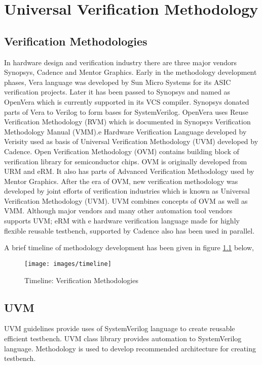 \chapter{Universal Verification Methodology}

\section{Verification Methodologies}

In hardware design and verification industry there are three major vendors Synopsys, Cadence and Mentor Graphics. Early in the methodology development phases, Vera language was developed by Sun Micro Systems for its ASIC verification projects. Later it has been passed to Synopsys and named as OpenVera which is currently supported in its VCS compiler. Synopsys donated parts of Vera to Verilog to form bases for SystemVerilog. OpenVera uses Reuse Verification Methodology (RVM) which is documented in Synopsys Verification Methodology Manual (VMM).e Hardware Verification Language developed by Verisity used as basis of Universal Verification Methodology (UVM) developed by Cadence. Open Verification Methodology (OVM) contains building block of verification library for semiconductor chips. OVM is originally developed from URM and eRM. It also has parts of Advanced Verification Methodology used by Mentor Graphics. After the era of OVM, new verification methodology was developed by joint efforts of verification industries which is known as Universal Verification Methodology (UVM). UVM combines concepts of OVM as well as VMM. Although major vendors and many other automation tool vendors supports UVM; eRM with e hardware verification language made for highly flexible reusable testbench, supported by Cadence also has been used in parallel. \par

A brief timeline of methodology development has been given in figure \ref{timeline} below,

\begin{figure}[h]
	\centering
	\texttt{[image: images/timeline]}
	\caption{Timeline: Verification Methodologies \label{timeline}}
\end{figure}

\section{UVM}

UVM guidelines provide uses of SystemVerilog language to create reusable efficient testbench. UVM class library provides automation to SystemVerilog language. Methodology is used to develop recommended architecture for creating testbench. \par

